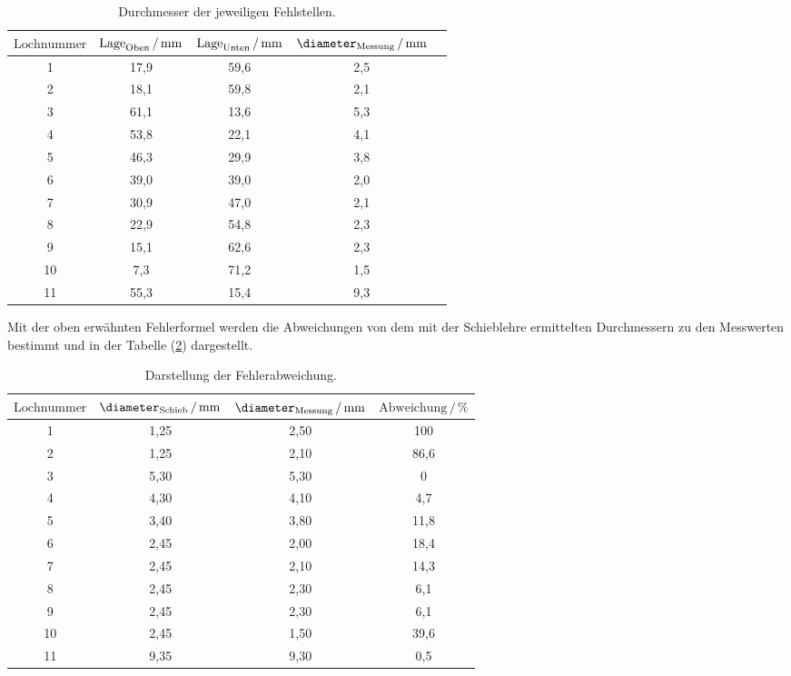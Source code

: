 \begin{table}[H]
  \centering
  \caption{Durchmesser der jeweiligen Fehlstellen.}
  \label{tab:5}
  \begin{tabular}{c c c c c}
    \toprule
     $\text{Lochnummer}$ &
     $\text{Lage}_{\text{Oben}} \,/\, \si[per-mode=fraction]{\milli\meter}$ &
     $\text{Lage}_{\text{Unten}} \,/\, \si[per-mode=fraction]{\milli\meter}$ &
     $\diameter_{\text{Messung}} \,/\, \si[per-mode=fraction]{\milli\meter}$ \\
     \midrule
     1 & 17,9 & 59,6 & 2,5\\
     2 & 18,1 & 59,8 & 2,1\\
     3 & 61,1 & 13,6 & 5,3\\
     4 & 53,8 & 22,1 & 4,1\\
     5 & 46,3 & 29,9 & 3,8\\
     6 & 39,0 & 39,0 & 2,0\\
     7 & 30,9 & 47,0 & 2,1\\
     8 & 22,9 & 54,8 & 2,3\\
     9 & 15,1 & 62,6 & 2,3\\
     10 & 7,3 & 71,2 & 1,5\\
     11 & 55,3& 15,4 & 9,3\\
     \bottomrule
  \end{tabular}
\end{table}
Mit der oben erwähnten Fehlerformel werden die Abweichungen von dem mit der Schieblehre
ermittelten Durchmessern zu den Messwerten
bestimmt und in der Tabelle (\ref{tab:6}) dargestellt.
\begin{table}[H]
  \centering
  \caption{Darstellung der Fehlerabweichung.}
  \label{tab:6}
  \begin{tabular}{c c c  c}
    \toprule
     $\text{Lochnummer}$ &
     $\diameter_{\text{Schieb}} \,/\, \si[per-mode=fraction]{\milli\meter}$ &
     $\diameter_{\text{Messung}} \,/\, \si[per-mode=fraction]{\milli\meter}$ &
     $\text{Abweichung} \,/\, \%$ \\
     \midrule
     1 &  1,25  & 2,50 & 100    \\
     2 &  1,25  & 2,10 & 86,6   \\
     3 &  5,30  & 5,30 & 0      \\
     4 &  4,30  & 4,10 & 4,7    \\
     5 &  3,40  & 3,80 & 11,8   \\
     6 &  2,45  & 2,00 & 18,4   \\
     7 &  2,45  & 2,10 & 14,3   \\
     8 &  2,45  & 2,30 & 6,1    \\
     9 &  2,45  & 2,30 & 6,1    \\
     10 & 2,45 & 1,50 &  39,6   \\
     11 & 9,35 & 9,30 &  0,5    \\
     \bottomrule
  \end{tabular}
\end{table}

